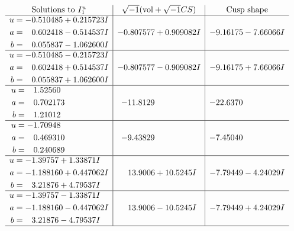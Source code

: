 \documentclass[1p]{elsarticle_modified}
\theoremstyle{definition}
\newcommand{\I}{\sqrt{-1}}
\begin{document}
$$\begin{array}{c|c|c}  
\text{Solutions to }I^u_{1}& \I (\text{vol} + \sqrt{-1}CS) & \text{Cusp shape}\\
 \hline 
\begin{aligned}
u &= -0.510485 + 0.215723 I \\
a &= \phantom{-}0.602418 - 0.514537 I \\
b &= \phantom{-}0.055837 - 1.062600 I\end{aligned}
 & -0.807577 + 0.909082 I & -9.16175 - 7.66066 I \\ \hline\begin{aligned}
u &= -0.510485 - 0.215723 I \\
a &= \phantom{-}0.602418 + 0.514537 I \\
b &= \phantom{-}0.055837 + 1.062600 I\end{aligned}
 & -0.807577 - 0.909082 I & -9.16175 + 7.66066 I \\ \hline\begin{aligned}
u &= \phantom{-}1.52560\phantom{ +0.000000I} \\
a &= \phantom{-}0.702173\phantom{ +0.000000I} \\
b &= \phantom{-}1.21012\phantom{ +0.000000I}\end{aligned}
 & -11.8129\phantom{ +0.000000I} & -22.6370\phantom{ +0.000000I} \\ \hline\begin{aligned}
u &= -1.70948\phantom{ +0.000000I} \\
a &= \phantom{-}0.469310\phantom{ +0.000000I} \\
b &= \phantom{-}0.240689\phantom{ +0.000000I}\end{aligned}
 & -9.43829\phantom{ +0.000000I} & -7.45040\phantom{ +0.000000I} \\ \hline\begin{aligned}
u &= -1.39757 + 1.33871 I \\
a &= -1.188160 + 0.447062 I \\
b &= \phantom{-}3.21876 + 4.79537 I\end{aligned}
 & \phantom{-}13.9006 + 10.5245 I & -7.79449 - 4.24029 I \\ \hline\begin{aligned}
u &= -1.39757 - 1.33871 I \\
a &= -1.188160 - 0.447062 I \\
b &= \phantom{-}3.21876 - 4.79537 I\end{aligned}
 & \phantom{-}13.9006 - 10.5245 I & -7.79449 + 4.24029 I\\
 \hline 
 \end{array}$$\newpage\newpage\renewcommand{\arraystretch}{1}
\end{document}
